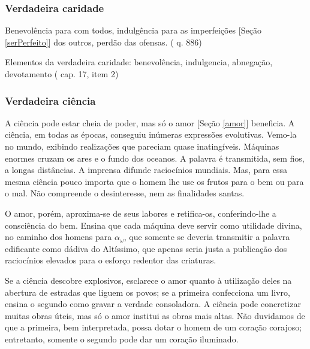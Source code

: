 \documentclass[12pt,a4paper]{article}
\begin{document}
			\subsubsection{Verdadeira caridade}
				\begin{flushright}
				\end{flushright}

                Benevol\^encia para com todos, indulg\^encia para as imperfei\c{c}\~oes [Se\c{c}\~ao \ref{serPerfeito}] dos outros, perd\~ao das ofensas. (\cite{le} q. 886)

				Elementos da verdadeira caridade: benevol\^encia, indulgencia, abnega\c{c}\~ao, devotamento (\cite{ese} cap. 17, item 2)

			\subsubsection{Verdadeira ci\^encia}
				\begin{flushright}
				\end{flushright}

				A ci\^encia pode estar cheia de poder, mas s\'o o amor [Se\c{c}\~ao \ref{amor}] beneficia. A ci\^encia, em todas as \'epocas, conseguiu in\'umeras express\~oes evolutivas. Vemo-la no mundo, exibindo realiza\c{c}\~oes que pareciam quase inating\'iveis. M\'aquinas enormes cruzam os ares e o fundo dos oceanos. A palavra \'e transmitida, sem fios, a longas dist\^ancias. A imprensa difunde racioc\'inios mundiais. Mas, para essa mesma ci\^encia pouco importa que o homem lhe use os frutos para o bem ou para o mal. N\~ao compreende o desinteresse, nem as finalidades santas.

				O amor, por\'em, aproxima-se de seus labores e retifica-os, conferindo-lhe a consci\^encia do bem. Ensina que cada m\'aquina deve servir como utilidade divina, no caminho dos homens para $ \alpha_\omega $, que somente se deveria transmitir a palavra edificante como d\'adiva do Alt\'issimo, que apenas seria justa a publica\c{c}\~ao dos racioc\'inios elevados para o esfor\c{c}o redentor das criaturas.

				Se a ci\^encia descobre explosivos, esclarece o amor quanto \`a utiliza\c{c}\~ao deles na abertura de estradas que liguem os povos; se a primeira confecciona um livro, ensina o segundo como gravar a verdade consoladora. A ci\^encia pode concretizar muitas obras \'uteis, mas s\'o o amor institui as obras mais altas. N\~ao duvidamos de que a primeira, bem interpretada, possa dotar o homem de um cora\c{c}\~ao corajoso; entretanto, somente o segundo pode dar um cora\c{c}\~ao iluminado.
\end{document}
